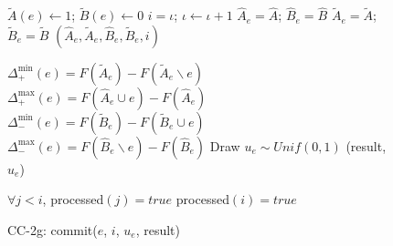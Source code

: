\documentclass{article} %
\newcommand{\occ}{CC-2g}
\begin{document}
\begin{figure}[t]
\begin{multicols}{2}
\begin{minipage}{0.47\textwidth}
    \end{minipage}

    \begin{minipage}{0.47\textwidth}
      \begin{algorithm}[H]
        \DontPrintSemicolon
        \caption{\occ{} getGuarantee($e$)}
        \label{alg:occsnapshot}
        $\tilde{A}(e) \leftarrow 1$;
        $\tilde{B}(e) \leftarrow 0$\;
        $i = \iota$;
        $\iota \leftarrow \iota + 1$\;\label{alg:occ:time}
        $\hat{A}_e = \hat{A}$;
        $\hat{B}_e = \hat{B}$\;
        $\tilde{A}_e = \tilde{A}$;
        $\tilde{B}_e = \tilde{B}$\;
        \Return $(\hat{A}_e, \tilde{A}_e, \hat{B}_e, \tilde{B}_e, i)$
      \end{algorithm}

      \begin{algorithm}[H]
        \DontPrintSemicolon
        \caption{\occ{} propose}
        \label{alg:propose}
        $\Delta_+^{\min}(e) = F(\tilde{A}_e) - F(\tilde{A}_e \backslash e)$\;\label{alg:occ:deltaplusmin}
        $\Delta_+^{\max}(e) = F(\hat{A}_e   \cup e) - F(\hat{A}_e)$\;\label{alg:occ:deltaplusmax}
        $\Delta_-^{\min}(e) = F(\tilde{B}_e) - F(\tilde{B}_e \cup e)$\;\label{alg:occ:deltaminusmin}
        $\Delta_-^{\max}(e) = F(\hat{B}_e   \backslash e) - F(\hat{B}_e)$\;\label{alg:occ:deltaminusmax}
        Draw $u_e \sim Unif(0,1)$\;
        \Return (result, $u_e$)
      \end{algorithm}

      \begin{algorithm}[H]
        \DontPrintSemicolon
        \caption{\occ{}: commit($e$, $i$, $u_e$, result)}
        \label{alg:occcommit}
        \WaitUntil $\forall j < i$, processed$(j) = true$\;\label{alg:occ:processedwait}
        processed$(i) = true$\;
      \end{algorithm}



\end{minipage}
\end{multicols}
\end{figure}
\end{document}
